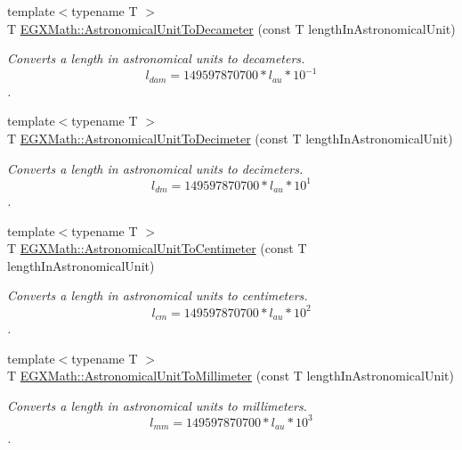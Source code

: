 \begin{DoxyCompactItemize}
{\footnotesize template$<$typename T $>$ }\\T \mbox{\hyperlink{group___e_g_x_math-_conversions-_length_conversions-_astronomical-_astronomical_unit-_s_i_gac8f9ac32051072ffda0b6e832c33cc7f}{E\+G\+X\+Math\+::\+Astronomical\+Unit\+To\+Decameter}} (const T length\+In\+Astronomical\+Unit)
\begin{DoxyCompactList}\small\item\em Converts a length in astronomical units to decameters. \[ l_{dam}=149597870700 * l_{au} * 10^{-1} \]. \end{DoxyCompactList}\item 
{\footnotesize template$<$typename T $>$ }\\T \mbox{\hyperlink{group___e_g_x_math-_conversions-_length_conversions-_astronomical-_astronomical_unit-_s_i_gab6dc67694d65c0f62ac3e4d750c5ed6e}{E\+G\+X\+Math\+::\+Astronomical\+Unit\+To\+Decimeter}} (const T length\+In\+Astronomical\+Unit)
\begin{DoxyCompactList}\small\item\em Converts a length in astronomical units to decimeters. \[ l_{dm}=149597870700 * l_{au} * 10^{1} \]. \end{DoxyCompactList}\item 
{\footnotesize template$<$typename T $>$ }\\T \mbox{\hyperlink{group___e_g_x_math-_conversions-_length_conversions-_astronomical-_astronomical_unit-_s_i_ga0d73749583f37bdf64ebe5cace907212}{E\+G\+X\+Math\+::\+Astronomical\+Unit\+To\+Centimeter}} (const T length\+In\+Astronomical\+Unit)
\begin{DoxyCompactList}\small\item\em Converts a length in astronomical units to centimeters. \[ l_{cm}=149597870700 * l_{au} * 10^{2} \]. \end{DoxyCompactList}\item 
{\footnotesize template$<$typename T $>$ }\\T \mbox{\hyperlink{group___e_g_x_math-_conversions-_length_conversions-_astronomical-_astronomical_unit-_s_i_ga8cb9e3414859d13ed8257893fff0f8b9}{E\+G\+X\+Math\+::\+Astronomical\+Unit\+To\+Millimeter}} (const T length\+In\+Astronomical\+Unit)
\begin{DoxyCompactList}\small\item\em Converts a length in astronomical units to millimeters. \[ l_{mm}=149597870700 * l_{au} * 10^{3} \]. \end{DoxyCompactList}\item 

\end{DoxyCompactItemize}
